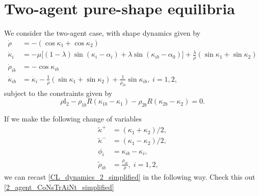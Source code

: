 \section{Two-agent pure-shape equilibria}
We consider the two-agent case, with shape dynamics given by
\begin{align}
\label{CL_dynamics_2_simplified}
\dot{\rho} &= - (\cos\kappa_1 + \cos\kappa_2) \nonumber \\
\dot{\kappa}_i &= - \mu \Big[(1 - \lambda)\sin(\kappa_i - \alpha_i) + \lambda \sin(\kappa_{ib} - \alpha_0) \Big] + \frac{\lambda}{\rho}(\sin\kappa_1 + \sin\kappa_2) \nonumber \\
\dot{\rho}_{ib} &= - \cos\kappa_{ib} \nonumber \\
\dot{\kappa}_{ib} &= \dot{\kappa}_i - \frac{1}{\rho}(\sin\kappa_1 + \sin\kappa_2) + \frac{1}{\rho_{ib}} \sin\kappa_{ib},  \; i=1,2,
\end{align}
subject to the constraints given by
\begin{equation}
\rho \mathbb{I}_2 - \rho_{1b} R(\kappa_{1b} - \kappa_1) - \rho_{2b} R(\kappa_{2b} - \kappa_{2}) = 0. 
\label{2_agent_CoNsTrAiNt_simplified}
\end{equation}

If we make the following change of variables
\begin{align}
\tilde{\kappa}^+ &= (\kappa_1 + \kappa_2)/2, \nonumber \\
\tilde{\kappa}^- &= (\kappa_1 - \kappa_2)/2, \nonumber \\
\phi_{i} &= \kappa_{ib} - \kappa_i, \nonumber \\
\tilde{\rho}_{ib} &= \frac{\rho_{ib} }{\rho}, \; i=1,2,
\end{align}
we can recast \eqref{CL_dynamics_2_simplified} in the following way. Check this out \eqref{2_agent_CoNsTrAiNt_simplified}
  
  
  
  
  
  
  
  
  
  
  
  
  
  
  
  
  
  
  
  
  